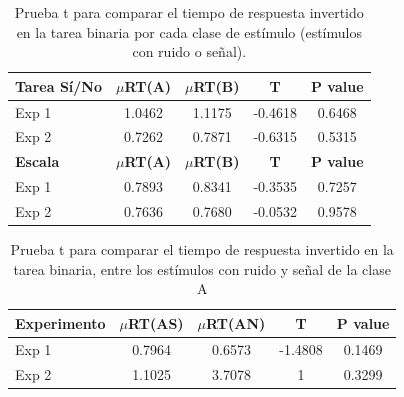 \begin{table}[h]
\caption[Prueba t para comparar el tiempo de respuesta en la tarea binaria y Escala de Confianza por cada clase de estímulo (ruido y señal)]{Prueba t para comparar el tiempo de respuesta invertido en la tarea binaria por cada clase de estímulo (estímulos con ruido o señal).}
\label{Cuadro_RT_AB}
\centering
\begin{tabular}{l |  c c c c}
\toprule
\textbf{Tarea Sí/No} & \textbf{$\mu$RT(A)} & \textbf{$\mu$RT(B)} & \textbf{T} & \textbf{P value}\\
\midrule
Exp 1 & 1.0462 & 1.1175 & -0.4618 & 0.6468 \\
Exp 2 & 0.7262 & 0.7871 & -0.6315 & 0.5315 \\
\midrule
\textbf{Escala} & \textbf{$\mu$RT(A)} & \textbf{$\mu$RT(B)} & \textbf{T} & \textbf{P value}\\
\midrule
Exp 1 & 0.7893 & 0.8341 & -0.3535 & 0.7257 \\
Exp 2 & 0.7636 & 0.7680 & -0.0532 & 0.9578 \\
\bottomrule
\end{tabular}
\end{table}

\begin{table}[h]
\caption[Prueba t para comparar el tiempo de respuesta invertido en la tarea binaria, entre los estímulos con ruido y señal de la clase A]{Prueba t para comparar el tiempo de respuesta invertido en la tarea binaria, entre los estímulos con ruido y señal de la clase A}
\label{Cuadro_RT1_A}
\centering
\begin{tabular}{l |  c c c c}
\toprule
\textbf{Experimento} & \textbf{$\mu$RT(AS)} & \textbf{$\mu$RT(AN)} & \textbf{T} & \textbf{P value}\\
\midrule
Exp 1 & 0.7964 & 0.6573 & -1.4808 & 0.1469 \\
Exp 2 & 1.1025 & 3.7078 & 1 & 0.3299 \\
\bottomrule
\end{tabular}
\end{table}

